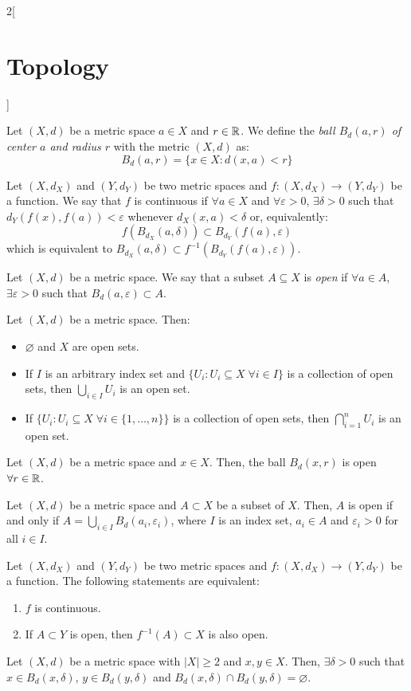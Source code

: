 \documentclass[../../../main.tex]{subfiles}
\begin{document}
\begin{multicols}{2}[\section{Topology}]
  \begin{definition}
    Let $(X,d)$ be a metric space $a\in X$ and $r\in\mathbb{R}$. We define the \textit{ball $B_d(a,r)$ of center $a$ and radius $r$} with the metric $(X,d)$ as: $$B_d(a,r)=\{x\in X:d(x,a)<r\}$$
  \end{definition}
  \begin{definition}
    Let $(X,d_X)$ and $(Y,d_Y)$ be two metric spaces and $f:(X,d_X)\rightarrow(Y,d_Y)$ be a function. We say that $f$ is continuous if $\forall a\in X$ and $\forall\varepsilon>0$, $\exists\delta>0$ such that $d_Y(f(x),f(a))<\varepsilon$ whenever $d_X(x,a)<\delta$ or, equivalently: $$f(B_{d_X}(a,\delta))\subset B_{d_Y}(f(a),\varepsilon)$$ which is equivalent to $B_{d_X}(a,\delta)\subset f^{-1}\left(B_{d_Y}(f(a),\varepsilon)\right)$.
  \end{definition}
  \begin{definition}
    Let $(X,d)$ be a metric space. We say that a subset $A\subseteq X$ is \textit{open} if $\forall a\in A$, $\exists\varepsilon>0$ such that $B_d(a,\varepsilon)\subset A$.
  \end{definition}
  \begin{prop}
    Let $(X,d)$ be a metric space. Then:
    \begin{itemize}
      \item $\varnothing$ and $X$ are open sets.
      \item If $I$ is an arbitrary index set and $\{U_i:U_i\subseteq X\;\forall i\in I\}$ is a collection of open sets, then $\bigcup_{i\in I}U_i$ is an open set.
      \item If $\{U_i:U_i\subseteq X\;\forall i\in \{1,\ldots,n\}\}$ is a collection of open sets, then $\bigcap_{i=1}^nU_i$ is an open set.
    \end{itemize}
  \end{prop}
  \begin{prop}
    Let $(X,d)$ be a metric space and $x\in X$. Then, the ball $B_d(x,r)$ is open $\forall r\in\mathbb{R}$.
  \end{prop}
  \begin{prop}
    Let $(X,d)$ be a metric space and $A\subset X$ be a subset of $X$. Then, $A$ is open if and only if $A=\bigcup_{i\in I}B_d(a_i,\varepsilon_i)$, where $I$ is an index set, $a_i\in A$ and $\varepsilon_i>0$ for all $i\in I$.
  \end{prop}
  \begin{theorem}
    Let $(X,d_X)$ and $(Y,d_Y)$ be two metric spaces and $f:(X,d_X)\rightarrow(Y,d_Y)$ be a function. The following statements are equivalent:
    \begin{enumerate}
      \item $f$ is continuous.
      \item If $A\subset Y$ is open, then $f^{-1}(A)\subset X$ is also open.
    \end{enumerate}
  \end{theorem}
  \begin{prop}
    Let $(X,d)$ be a metric space with $|X|\geq 2$ and $x,y\in X$. Then, $\exists\delta>0$ such that $x\in B_d(x,\delta)$, $y\in B_d(y,\delta)$ and $B_d(x,\delta)\cap B_d(y,\delta)=\varnothing$.
  \end{prop}

\end{multicols}
\end{document}
